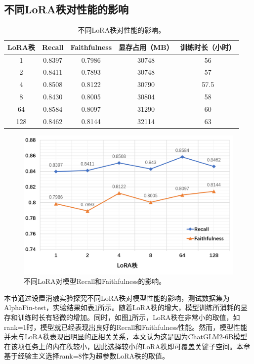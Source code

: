 \subsection{不同LoRA秩对性能的影响}

\begin{table}
	\caption{\label{lora_rank_ablation}不同LoRA秩对性能的影响。}
	\centering{}%
	\small
	\begin{tabular}{ccccc}
		\toprule[2pt]
		LoRA秩 & Recall & Faithfulness & 显存占用（MB） & 训练时长（小时） \\
		\hline
		1 & 0.8397 & 0.7986 & 30748 & 56 \\
		2 & 0.8411 & 0.7893 & 30748 & 57 \\
		4 & 0.8508 & 0.8122 & 30790 & 57.5 \\
		8 & 0.8430 & 0.8005 & 30804 & 58 \\
		64 & 0.8584 & 0.8097 & 31290 & 60 \\
		128 & 0.8462 & 0.8144 & 32114 & 63 \\
		\bottomrule[2pt]
	\end{tabular}
\end{table}

\begin{figure}[htbp]
	\centering
	\includegraphics[scale=0.55]{Fig/lora_rank_ablation.png}
	\caption{\label{lora_rank_ablation_fig}不同LoRA对模型Recall和Faithfulness的影响。}
\end{figure}

本节通过设置消融实验探究不同LoRA秩对模型性能的影响，测试数据集为AlphaFin-test，实验结果如表\ref{lora_rank_ablation}所示。随着LoRA秩的增大，模型训练所消耗的显存和训练时长有轻微的增加。同时，如图\ref{lora_rank_ablation_fig}所示，LoRA秩在非常小的取值，如rank=1时，模型就已经表现出良好的Recall和Faithfulness性能。然而，模型性能并未与LoRA秩表现出明显的正相关关系，本文认为这是因为ChatGLM2-6B模型在该项任务上的内在秩较小，因此选择较小的LoRA秩即可覆盖关键子空间。本章基于经验主义选择rank=8作为超参数LoRA秩的取值。

